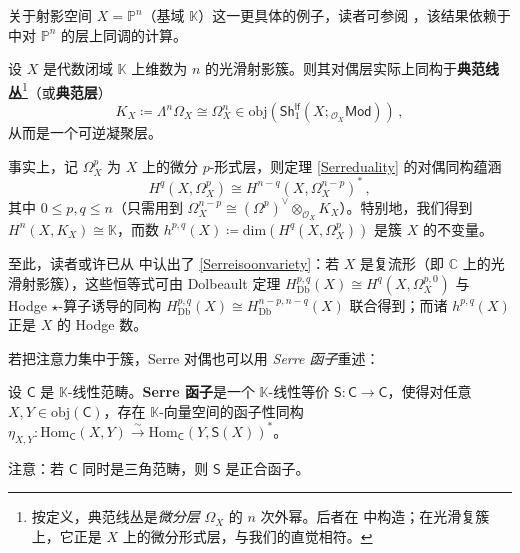 关于射影空间 $X=\mathbb{P}^n$（基域 $\mathbb{K}$）这一更具体的例子，读者可参阅 \cite[定理 III.7.1]{[Har77]}，该结果依赖于 \cite[第 III.5 节]{[Har77]} 中对 $\mathbb{P}^n$ 的层上同调的计算。

\begin{Rem}\label{cansheaf}
	设 $X$ 是代数闭域 $\mathbb{K}$ 上维数为 $n$ 的光滑射影簇。则其对偶层实际上同构于\textbf{典范线丛}\footnote{按定义，典范线丛是\textit{微分层} $\Omega_X$ 的 $n$ 次外幂。后者在 \cite[第 II.8 节]{[Har77]} 中构造；在光滑复簇上，它正是 $X$ 上的微分形式层，与我们的直觉相符。}（或\textbf{典范层}）
	\begin{equation}
		K_X\coloneqq \Lambda^n\Omega_X\cong\Omega_X^n\in\text{obj}(\mathsf{Sh}^\mathsf{lf}_1(X;{}_{\mathcal{O}_X}\mathsf{Mod}))\,,
	\end{equation}
	从而是一个可逆凝聚层。

	事实上，记 $\Omega_X^p$ 为 $X$ 上的微分 $p$-形式层，则定理 \ref{Serreduality} 的对偶同构蕴涵
	\begin{equation}\label{Serreisoonvariety}
		H^q(X,\Omega_X^p)\cong H^{n-q}(X,\Omega_X^{n-p})^*\,,
	\end{equation}
	其中 $0\leq p,q\leq n$（只需用到 $\Omega_X^{n-p}\cong (\Omega^p)^\vee\otimes_{\mathcal{O}_X}\! K_X$）。特别地，我们得到 $H^n(X,K_X)\cong\mathbb{K}$，而数 $h^{p,q}(X)\coloneqq\text{dim}(H^q(X,\Omega_X^p))$ 是簇 $X$ 的不变量。

	至此，读者或许已从 \cite[第 7.2 节]{[Imp21]} 中认出了 \eqref{Serreisoonvariety}：若 $X$ 是复流形（即 $\mathbb{C}$ 上的光滑射影簇），这些恒等式可由 Dolbeault 定理 $H_\text{Db}^{p,q}(X)\cong H^q(X,\Omega_X^{p,0})$ 与 Hodge $\star$-算子诱导的同构 $H_\text{Db}^{p,q}(X)\cong H_\text{Db}^{n-p,n-q}(X)$ 联合得到；而诸 $h^{p,q}(X)$ 正是 $X$ 的 Hodge 数。
\end{Rem}

若把注意力集中于簇，Serre 对偶也可以用 \textit{Serre 函子}重述：

\begin{Def}\label{Serrefunc}
	设 $\mathsf{C}$ 是 $\mathbb{K}$-线性范畴。\textbf{Serre 函子}是一个 $\mathbb{K}$-线性等价 $\mathsf{S}:\mathsf{C}\rightarrow\mathsf{C}$，使得对任意 $X,Y\in\text{obj}(\mathsf{C})$，存在 $\mathbb{K}$-向量空间的函子性同构 $\eta_{X,Y}:\text{Hom}_\mathsf{C}(X,Y)\xrightarrow{\sim}\text{Hom}_\mathsf{C}(Y,\mathsf{S}(X))^*$。

	注意：若 $\mathsf{C}$ 同时是三角范畴，则 $\mathsf{S}$ 是正合函子。
\end{Def}

